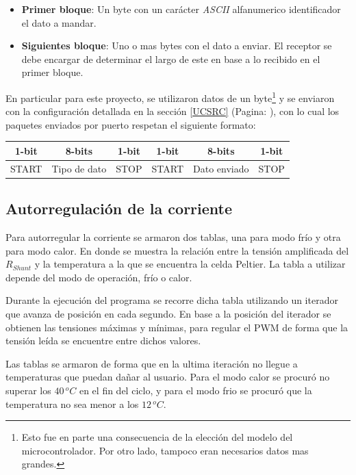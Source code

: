 \documentclass[10pt,spanish,a4paper,openany,notitlepage]{article}
\begin{document}
\begin{itemize}
\item \textbf{Primer bloque}: Un byte con un carácter \textit{ASCII} alfanumerico identificador el dato a mandar.
\item \textbf{Siguientes bloque}: Uno o mas bytes con el dato a enviar. El receptor se debe encargar de determinar el largo de este en base a lo recibido en el primer bloque.
\end{itemize}

En particular para este proyecto, se utilizaron datos de un byte\footnote{Esto fue en parte una consecuencia de la elección del modelo del microcontrolador. Por otro lado, tampoco eran necesarios datos mas grandes.} y se enviaron con la configuración detallada en la sección \ref{UCSRC} (Pagina: \pageref{UCSRC}), con lo cual los paquetes enviados por puerto respetan el siguiente formato:

\begin{center}
\begin{tabular}{|c|c|c|c|c|c|}\hline
1-bit&8-bits&1-bit&1-bit&8-bits&1-bit\\\hline
START&Tipo de dato&STOP&START&Dato enviado&STOP\\\hline
\end{tabular}
\end{center}

\subsection{Autorregulación de la corriente}

Para autorregular la corriente se armaron dos tablas, una para modo frío
y otra para modo calor. En donde se muestra la relación entre la tensión
amplificada del $R_{Shunt}$ y la temperatura a la que se encuentra la celda Peltier.
La tabla a utilizar depende del modo de operación, frío o calor.

Durante la ejecución del programa se recorre dicha tabla utilizando un iterador
que avanza de posición en cada segundo. En base a la posición del iterador
se obtienen las tensiones máximas y mínimas, para regular el PWM de forma
que la tensión leída se encuentre entre dichos valores.

Las tablas se armaron de forma que en la ultima iteración no llegue a temperaturas
que puedan dañar al usuario. Para el modo calor se procuró no superar los
$40\, \unit{^oC}$ en el fin del ciclo, y para el modo frio se procuró que
la temperatura no sea menor a los $12\, \unit{^oC}$.
\end{document}
